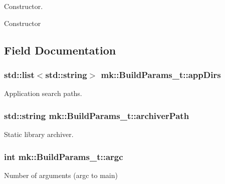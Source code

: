 Constructor. 

Constructor 

\subsection{Field Documentation}
\subsubsection[{\texorpdfstring{app\+Dirs}{appDirs}}]{\setlength{\rightskip}{0pt plus 5cm}std\+::list$<$std\+::string$>$ mk\+::\+Build\+Params\+\_\+t\+::app\+Dirs}\hypertarget{structmk_1_1_build_params__t_aeed5fec0e9fb17781a31f61bcebcf65e}{}\label{structmk_1_1_build_params__t_aeed5fec0e9fb17781a31f61bcebcf65e}


Application search paths. 

\subsubsection[{\texorpdfstring{archiver\+Path}{archiverPath}}]{\setlength{\rightskip}{0pt plus 5cm}std\+::string mk\+::\+Build\+Params\+\_\+t\+::archiver\+Path}\hypertarget{structmk_1_1_build_params__t_a727eb93fac4297e3f8f2084455cb609e}{}\label{structmk_1_1_build_params__t_a727eb93fac4297e3f8f2084455cb609e}


Static library archiver. 

\subsubsection[{\texorpdfstring{argc}{argc}}]{\setlength{\rightskip}{0pt plus 5cm}int mk\+::\+Build\+Params\+\_\+t\+::argc}\hypertarget{structmk_1_1_build_params__t_ad75f63f97eceed858f47a0317b83f80b}{}\label{structmk_1_1_build_params__t_ad75f63f97eceed858f47a0317b83f80b}


Number of arguments (argc to main) 

